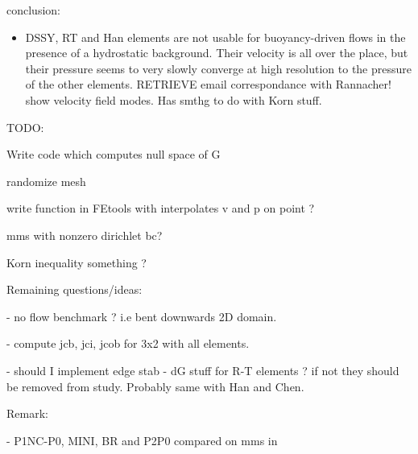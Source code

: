 conclusion:

\begin{itemize}
\item DSSY, RT and Han elements are not usable for buoyancy-driven flows in the presence of a hydrostatic 
background. Their velocity is all over the place, but their pressure seems to very slowly 
converge at high resolution to the pressure of the other elements.
RETRIEVE email correspondance with Rannacher! show velocity field modes. Has smthg to do with 
Korn stuff.
\end{itemize}















\newpage
TODO:

Write code which computes null space of G 

randomize mesh

write function in FEtools with interpolates v and p on point ?

mms with nonzero dirichlet bc?

Korn inequality something ?



Remaining questions/ideas:

- no flow benchmark ? i.e bent downwards 2D domain. 

- compute jcb, jci, jcob for 3x2 with all elements.

- should I implement edge stab - dG stuff for R-T elements ? if not they should be  
removed from study. Probably same with Han and Chen.

Remark:

- P1NC-P0, MINI, BR and P2P0 compared on mms in \cite{cakp15}


